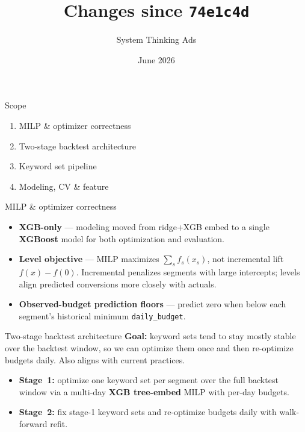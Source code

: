 \documentclass[11pt]{beamer}
\title{Changes since \texttt{74e1c4d}}
\author{System Thinking Ads}
\date{June 2026}
\begin{document}
\begin{frame}{Scope}

  \vspace{0.75em}
  \begin{enumerate}
    \item MILP \& optimizer correctness
    \item Two-stage backtest architecture
    \item Keyword set pipeline
    \item Modeling, CV \& feature
  \end{enumerate}
\end{frame}

\begin{frame}{MILP \& optimizer correctness}
  \footnotesize

  \begin{itemize}
    \item \textbf{XGB-only} --- modeling moved from ridge+XGB embed to a single \textbf{XGBoost} model for both optimization and evaluation.
    \item \textbf{Level objective} --- MILP maximizes $\sum_s f_s(x_s)$, not incremental lift $f(x)-f(0)$. Incremental penalizes segments with large intercepts; levels align predicted conversions more closely with actuals.
    \item \textbf{Observed-budget prediction floors} --- predict zero when below each segment's historical minimum \texttt{daily\_budget}.
  \end{itemize}
  \normalsize
\end{frame}

\begin{frame}{Two-stage backtest architecture}
    \textbf{Goal:} keyword sets tend to stay mostly stable over the backtest window, so we can optimize them once and then re-optimize budgets daily. Also aligns with current practices.
  \begin{itemize}
    \item \textbf{Stage~1:} optimize one keyword set per segment over the full backtest window via a multi-day \textbf{XGB tree-embed} MILP with per-day budgets.
    \item \textbf{Stage~2:} fix stage-1 keyword sets and re-optimize budgets daily with walk-forward refit.
  \end{itemize}
\end{frame}
\end{document}
